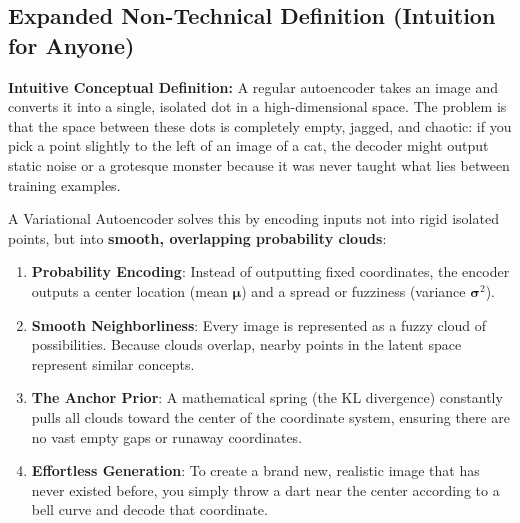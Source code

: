 \documentclass[11pt,a4paper]{article}
\theoremstyle{definition}
\begin{document}
\subsection{Expanded Non-Technical Definition (Intuition for Anyone)}
\textbf{Intuitive Conceptual Definition:}
A regular autoencoder takes an image and converts it into a single, isolated dot in a high-dimensional space. The problem is that the space between these dots is completely empty, jagged, and chaotic: if you pick a point slightly to the left of an image of a cat, the decoder might output static noise or a grotesque monster because it was never taught what lies between training examples.

A Variational Autoencoder solves this by encoding inputs not into rigid isolated points, but into \textbf{smooth, overlapping probability clouds}:
\begin{enumerate}
    \item \textbf{Probability Encoding}: Instead of outputting fixed coordinates, the encoder outputs a center location (mean $\boldsymbol{\mu}$) and a spread or fuzziness (variance $\boldsymbol{\sigma}^2$).
    \item \textbf{Smooth Neighborliness}: Every image is represented as a fuzzy cloud of possibilities. Because clouds overlap, nearby points in the latent space represent similar concepts.
    \item \textbf{The Anchor Prior}: A mathematical spring (the KL divergence) constantly pulls all clouds toward the center of the coordinate system, ensuring there are no vast empty gaps or runaway coordinates.
    \item \textbf{Effortless Generation}: To create a brand new, realistic image that has never existed before, you simply throw a dart near the center according to a bell curve and decode that coordinate.
\end{enumerate}
\end{document}
